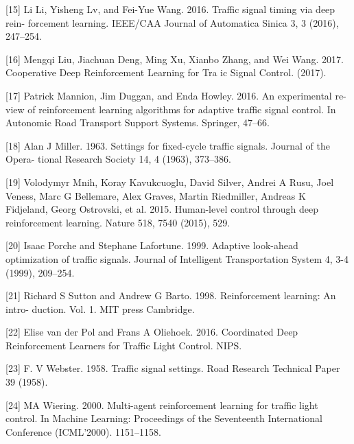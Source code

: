 \documentclass{article}
\begin{document}
[15] Li Li, Yisheng Lv, and Fei-Yue Wang. 2016. Traffic signal timing via deep rein-
forcement learning. IEEE/CAA Journal of Automatica Sinica 3, 3 (2016), 247–254.

[16] Mengqi Liu, Jiachuan Deng, Ming Xu, Xianbo Zhang, and Wei Wang. 2017.
Cooperative Deep Reinforcement Learning for Tra ic Signal Control. (2017).

[17] Patrick Mannion, Jim Duggan, and Enda Howley. 2016. An experimental re-
view of reinforcement learning algorithms for adaptive traffic signal control. In
Autonomic Road Transport Support Systems. Springer, 47–66.

[18] Alan J Miller. 1963. Settings for fixed-cycle traffic signals. Journal of the Opera-
tional Research Society 14, 4 (1963), 373–386.

[19] Volodymyr Mnih, Koray Kavukcuoglu, David Silver, Andrei A Rusu, Joel Veness,
Marc G Bellemare, Alex Graves, Martin Riedmiller, Andreas K Fidjeland, Georg
Ostrovski, et al. 2015. Human-level control through deep reinforcement learning.
Nature 518, 7540 (2015), 529.

[20] Isaac Porche and Stephane Lafortune. 1999. Adaptive look-ahead optimization of
traffic signals. Journal of Intelligent Transportation System 4, 3-4 (1999), 209–254.

[21] Richard S Sutton and Andrew G Barto. 1998. Reinforcement learning: An intro-
duction. Vol. 1. MIT press Cambridge.

[22] Elise van der Pol and Frans A Oliehoek. 2016. Coordinated Deep Reinforcement
Learners for Traffic Light Control. NIPS.

[23] F. V Webster. 1958. Traffic signal settings. Road Research Technical Paper 39
(1958).

[24] MA Wiering. 2000. Multi-agent reinforcement learning for traffic light control.
In Machine Learning: Proceedings of the Seventeenth International Conference
(ICML’2000). 1151–1158.
\end{document}
